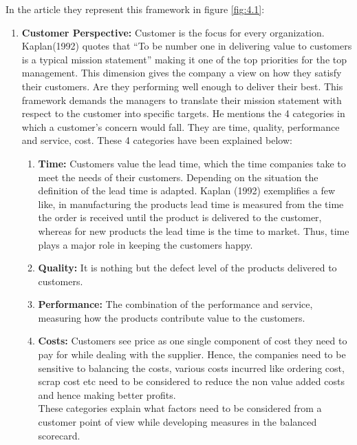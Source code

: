 In the article they represent this framework in figure \ref{fig:4.1}:\\

\begin{enumerate}
  \item \textbf{Customer Perspective:}
            Customer is the focus for every organization. Kaplan(1992) quotes that “To be number one in delivering value to customers is a typical mission statement” making it one of the top priorities for the top management. This dimension gives the company a view on how they satisfy their customers. Are they performing well enough to deliver their best. This framework demands the managers to translate their mission statement with respect to the customer into specific targets. He mentions the 4 categories in which a customer’s concern would fall. They are time, quality, performance and service, cost. These 4 categories have been explained below:\\
  \begin{enumerate}
    \item \textbf{Time:}
    Customers value the lead time, which the time companies take to meet the needs of their customers. Depending on the situation the definition of the lead time is adapted. Kaplan (1992) exemplifies a few like, in manufacturing the products lead time is measured from the time the order is received until the product is delivered to the customer, whereas for new products the lead time is the time to market. Thus, time plays a major role in keeping the customers happy.\\
    \item \textbf{Quality:}
    It is nothing but the defect level of the products delivered to customers.\\
    \item \textbf{Performance:}
    The combination of the performance and service, measuring how the products contribute value to the customers.\\
    \item \textbf{Costs:}
    Customers see price as one single component of cost they need to pay for while dealing with the supplier. Hence, the companies need to be sensitive to balancing the costs, various costs incurred like ordering cost, scrap cost etc need to be considered to reduce the non value added costs and hence making better profits.\\
    These categories explain what factors need to be considered from a customer point of view while developing measures in the balanced scorecard.\\

\end{enumerate}
\end{enumerate}

